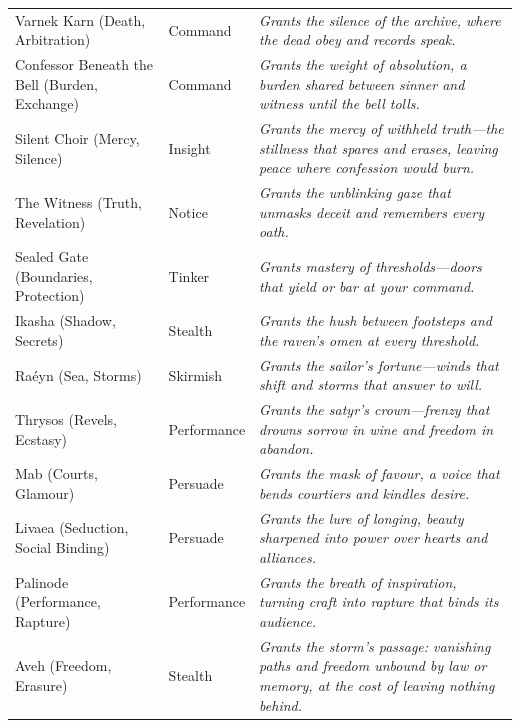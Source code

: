 \begin{longtable}{@{}p{4.2cm}p{3.2cm}p{7.2cm}@{}}
  Varnek Karn (Death, Arbitration) & Command &
  \emph{Grants the silence of the archive, where the dead obey and records speak.} \\
  
  Confessor Beneath the Bell (Burden, Exchange) & Command &
  \emph{Grants the weight of absolution, a burden shared between sinner and witness until the bell tolls.} \\
  
  Silent Choir (Mercy, Silence) & Insight &
  \emph{Grants the mercy of withheld truth---the stillness that spares and erases, leaving peace where confession would burn.} \\
  
  The Witness (Truth, Revelation) & Notice &
  \emph{Grants the unblinking gaze that unmasks deceit and remembers every oath.} \\
  
  Sealed Gate (Boundaries, Protection) & Tinker &
  \emph{Grants mastery of thresholds---doors that yield or bar at your command.} \\

  Ikasha (Shadow, Secrets) & Stealth &
  \emph{Grants the hush between footsteps and the raven's omen at every threshold.} \\
  
  Raéyn (Sea, Storms) & Skirmish &
  \emph{Grants the sailor's fortune---winds that shift and storms that answer to will.} \\
  
  Thrysos (Revels, Ecstasy) & Performance &
  \emph{Grants the satyr's crown---frenzy that drowns sorrow in wine and freedom in abandon.} \\
  
  Mab (Courts, Glamour) & Persuade &
  \emph{Grants the mask of favour, a voice that bends courtiers and kindles desire.} \\
  
  Livaea (Seduction, Social Binding) & Persuade &
  \emph{Grants the lure of longing, beauty sharpened into power over hearts and alliances.} \\
  
  Palinode (Performance, Rapture) & Performance &
  \emph{Grants the breath of inspiration, turning craft into rapture that binds its audience.} \\
  
  Aveh (Freedom, Erasure) & Stealth &
  \emph{Grants the storm's passage: vanishing paths and freedom unbound by law or memory, at the cost of leaving nothing behind.} \\
  

\end{longtable}
